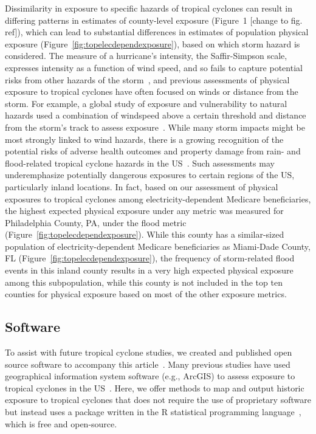Dissimilarity in exposure to specific hazards of tropical cyclones can result
in differing patterns in estimates of county-level exposure (Figure~1 [change
to fig. ref]), which can lead to substantial differences in estimates of
population physical exposure (Figure~\ref{fig:topelecdependexposure}), based on
which storm hazard is considered. The measure of a hurricane's intensity, the
Saffir-Simpson scale, expresses intensity as a function of wind speed, and so
fails to capture potential risks from other hazards of the
storm~\citep{smith2009}, and previous assessments of physical exposure to
tropical cyclones have often focused on winds or distance from the storm. For
example, a global study of exposure and vulnerability to natural hazards used a
combination of windspeed above a certain threshold and distance from the
storm's track to assess exposure~\citep{peduzzi2009assessing}. While many storm
impacts might be most strongly linked to wind hazards, there is a growing
recognition of the potential risks of adverse health outcomes and property
damage from rain- and flood-related tropical cyclone hazards in the
\ac{US}~\citep{smith2009}. Such assessments may underemphasize potentially
dangerous exposures to certain regions of the \ac{US}, particularly inland
locations. In fact, based on our assessment of physical exposures to tropical
cyclones among electricity-dependent Medicare beneficiaries, the highest
expected physical exposure under any metric was measured for Philadelphia
County, PA, under the flood metric (Figure~\ref{fig:topelecdependexposure}).
While this county has a similar-sized population of electricity-dependent
Medicare beneficiaries as Miami-Dade County, FL
(Figure~\ref{fig:topelecdependexposure}), the frequency of storm-related flood
events in this inland county results in a very high expected physical exposure
among this subpopulation, while this county is not included in the top ten
counties for physical exposure based on most of the other exposure metrics.

\subsection*{Software}

To assist with future tropical cyclone studies, we created and published open
source software to accompany this article~\citep{hurricaneexposuredata,
hurricaneexposure}. Many previous studies have used geographical
information system software (e.g., ArcGIS) to assess exposure to tropical
cyclones in the \ac{US}~\citep{grabich2016, zandbergen2009, czajkowski2011,
kruk2010}. Here, we offer methods to map and output historic exposure to
tropical cyclones that does not require the use of proprietary software but
instead uses a package written in the R statistical programming
language~\citep{R}, which is free and open-source.

